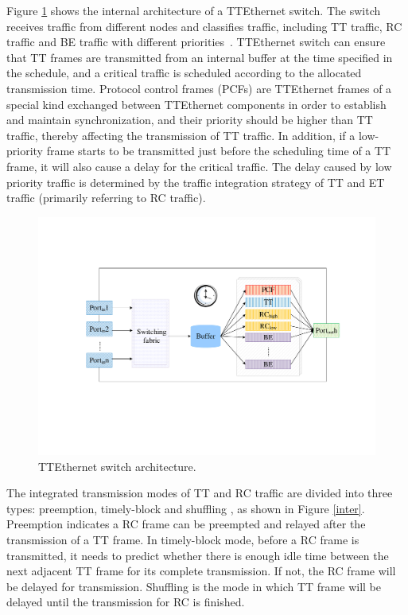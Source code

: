 \documentclass[electronics,article,accept,moreauthors,pdftex]{Definitions/mdpi}
\begin{document}
{Figure} \ref{swi} shows the internal architecture of a TTEthernet switch. The switch receives traffic from different nodes and classifies traffic, including TT traffic, RC traffic and BE traffic with different priorities~\cite{finzi2019integration}. TTEthernet switch can ensure that TT frames are transmitted from an internal buffer at the time specified in the schedule, and a critical traffic is scheduled according to the allocated transmission time. Protocol control frames (PCFs) are TTEthernet frames of a special kind  exchanged between TTEthernet components in order to establish and maintain synchronization, and their priority should be higher than TT traffic, thereby affecting the transmission of TT traffic. In addition, if a low-priority frame starts to be transmitted just before the scheduling time of a TT frame, it will also cause a delay for the critical traffic. The delay caused by low priority traffic is determined by the traffic integration strategy of TT and ET traffic (primarily referring to RC traffic).

\begin{figure}[H]
\centering
\includegraphics [scale=0.46] {figures/switch}
\caption{TTEthernet %
	 switch architecture.}
\label{swi}
\end{figure}
The integrated transmission modes of TT and RC traffic are divided into three types: preemption, timely-block and shuffling \cite{kermia2017schedulability}, as shown in {Figure} \ref{inter}. Preemption indicates a RC frame can be preempted and relayed after the transmission of a TT frame. In timely-block mode, before a RC frame is transmitted, it needs to predict whether there is enough idle time between the next adjacent TT frame for its complete transmission. If not, the RC frame will be delayed for transmission. Shuffling is the mode in which TT frame will be delayed until the transmission for RC is finished.
\end{document}
